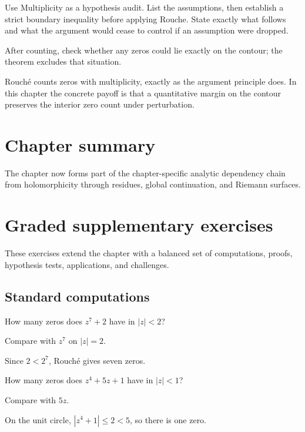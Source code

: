 \begin{exercise}\label{exr:iv13-08}
Use Multiplicity as a hypothesis audit. List the assumptions, then establish a strict boundary inequality before applying Rouche. State exactly what follows and what the argument would cease to control if an assumption were dropped.
\end{exercise}
\begin{hint}
After counting, check whether any zeros could lie exactly on the contour; the theorem excludes that situation.
\end{hint}
\begin{solution}
Rouché counts zeros with multiplicity, exactly as the argument principle does. In this chapter the concrete payoff is that a quantitative margin on the contour preserves the interior zero count under perturbation.
\end{solution}

\section*{Chapter summary}
The chapter now forms part of the chapter-specific analytic dependency chain from holomorphicity through residues, global continuation, and Riemann surfaces.
\section{Graded supplementary exercises}
These exercises extend the chapter with a balanced set of computations, proofs, hypothesis tests, applications, and challenges.

\subsection*{Standard computations}

\begin{exercise}\label{exr:iv13-expand-01}
How many zeros does \(z^7+2\) have in \(|z|<2\)?
\end{exercise}
\begin{hint}
Compare with \(z^7\) on \(|z|=2\).
\end{hint}
\begin{solution}
Since \(2<2^7\), Rouché gives seven zeros.
\end{solution}

\begin{exercise}\label{exr:iv13-expand-02}
How many zeros does \(z^4+5z+1\) have in \(|z|<1\)?
\end{exercise}
\begin{hint}
Compare with \(5z\).
\end{hint}
\begin{solution}
On the unit circle, \(|z^4+1|\le2<5\), so there is one zero.
\end{solution}

